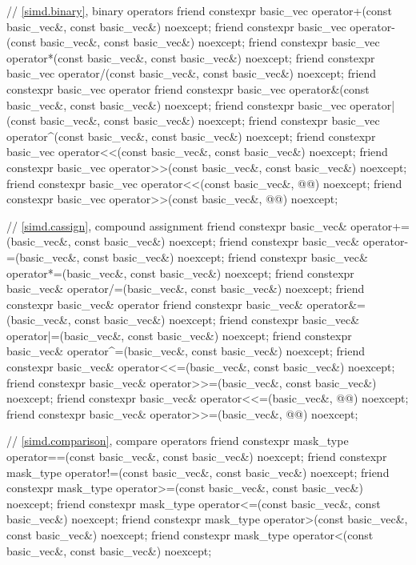 \begin{codeblock}
{{    // \ref{simd.binary},  binary operators
    friend constexpr basic_vec operator+(const basic_vec&, const basic_vec&) noexcept;
    friend constexpr basic_vec operator-(const basic_vec&, const basic_vec&) noexcept;
    friend constexpr basic_vec operator*(const basic_vec&, const basic_vec&) noexcept;
    friend constexpr basic_vec operator/(const basic_vec&, const basic_vec&) noexcept;
    friend constexpr basic_vec operator%
    friend constexpr basic_vec operator&(const basic_vec&, const basic_vec&) noexcept;
    friend constexpr basic_vec operator|(const basic_vec&, const basic_vec&) noexcept;
    friend constexpr basic_vec operator^(const basic_vec&, const basic_vec&) noexcept;
    friend constexpr basic_vec operator<<(const basic_vec&, const basic_vec&) noexcept;
    friend constexpr basic_vec operator>>(const basic_vec&, const basic_vec&) noexcept;
    friend constexpr basic_vec operator<<(const basic_vec&, @@) noexcept;
    friend constexpr basic_vec operator>>(const basic_vec&, @@) noexcept;

    // \ref{simd.cassign},  compound assignment
    friend constexpr basic_vec& operator+=(basic_vec&, const basic_vec&) noexcept;
    friend constexpr basic_vec& operator-=(basic_vec&, const basic_vec&) noexcept;
    friend constexpr basic_vec& operator*=(basic_vec&, const basic_vec&) noexcept;
    friend constexpr basic_vec& operator/=(basic_vec&, const basic_vec&) noexcept;
    friend constexpr basic_vec& operator%
    friend constexpr basic_vec& operator&=(basic_vec&, const basic_vec&) noexcept;
    friend constexpr basic_vec& operator|=(basic_vec&, const basic_vec&) noexcept;
    friend constexpr basic_vec& operator^=(basic_vec&, const basic_vec&) noexcept;
    friend constexpr basic_vec& operator<<=(basic_vec&, const basic_vec&) noexcept;
    friend constexpr basic_vec& operator>>=(basic_vec&, const basic_vec&) noexcept;
    friend constexpr basic_vec& operator<<=(basic_vec&, @@) noexcept;
    friend constexpr basic_vec& operator>>=(basic_vec&, @@) noexcept;

    // \ref{simd.comparison},  compare operators
    friend constexpr mask_type operator==(const basic_vec&, const basic_vec&) noexcept;
    friend constexpr mask_type operator!=(const basic_vec&, const basic_vec&) noexcept;
    friend constexpr mask_type operator>=(const basic_vec&, const basic_vec&) noexcept;
    friend constexpr mask_type operator<=(const basic_vec&, const basic_vec&) noexcept;
    friend constexpr mask_type operator>(const basic_vec&, const basic_vec&) noexcept;
    friend constexpr mask_type operator<(const basic_vec&, const basic_vec&) noexcept;

}}
\end{codeblock}
